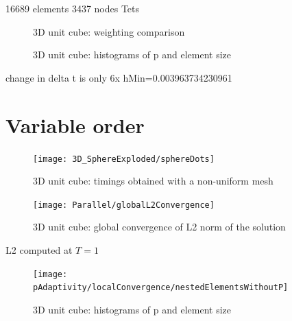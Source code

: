 16689 elements
3437 nodes
Tets
\begin{figure}[!ht]
	\centering
{}
\caption{3D unit cube: weighting comparison}
	\label{fig:unitCubeNonUniformTimings}
\end{figure}
\begin{figure}[!ht]
	\centering
\caption{3D unit cube: histograms of p and element size}
	\label{fig:unitCubeNonUniformTimings}
\end{figure}

change in delta t is only 6x
hMin=0.003963734230961


\section{Variable order}
\begin{figure}[!ht]
	\centering
  \texttt{[image: 3D\_SphereExploded/sphereDots]}
	\caption{3D unit cube: timings obtained with a non-uniform mesh}
	\label{fig:unitCubeNonUniformAdaptiveP}
\end{figure}
\begin{figure}[!ht]
	\centering
\texttt{[image: Parallel/globalL2Convergence]}
\caption{3D unit cube: global convergence of L2 norm of the solution}
	\label{fig:unitCubeNonUniformGlobalAdaptivePL2Conv}
\end{figure}
L2 computed at $T=1$
\begin{figure}[!ht]
	\centering
{}
\end{figure}
\begin{figure}[!ht]
	\centering
  \texttt{[image: pAdaptivity/localConvergence/nestedElementsWithoutP]}
\caption{3D unit cube: histograms of p and element size}
	\label{fig:unitCubeNonUniformTimings}
\end{figure}
